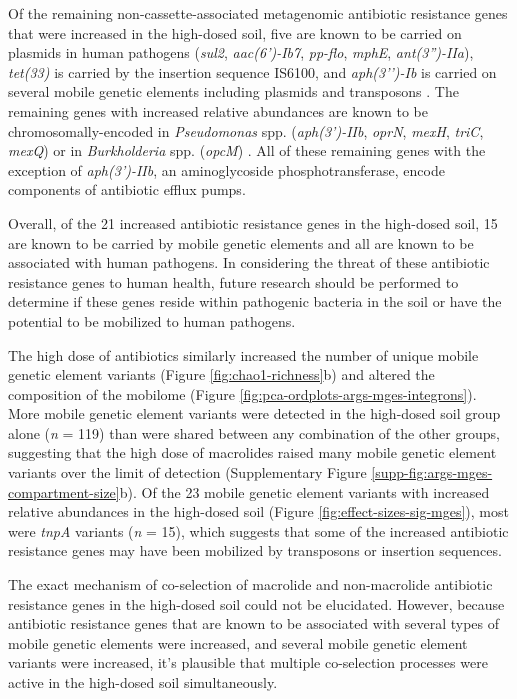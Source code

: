 Of the remaining non-cassette-associated metagenomic antibiotic resistance genes that were increased in the high-dosed soil, five are known to be carried on plasmids in human pathogens (\textit{sul2}, \textit{aac(6')-Ib7}, \textit{pp-flo}, \textit{mphE}, \textit{ant(3'')-IIa}), \textit{tet(33)} is carried by the insertion sequence IS6100, and \textit{aph(3’’)-Ib} is carried on several mobile genetic elements including plasmids and transposons \parencite{Alcock.2020, Tauch.2002}.
The remaining genes with increased relative abundances are known to be chromosomally-encoded in \textit{Pseudomonas} spp. (\textit{aph(3’)-IIb}, \textit{oprN}, \textit{mexH}, \textit{triC}, \textit{mexQ}) or in \textit{Burkholderia} spp. (\textit{opcM}) \parencite{Hachler.1996, Mesaros.2007, Mima.2005, Mima.2007, Burns.1996}.
All of these remaining genes with the exception of \textit{aph(3')-IIb}, an aminoglycoside phosphotransferase, encode components of antibiotic efflux pumps.

Overall, of the 21 increased antibiotic resistance genes in the high-dosed soil, 15 are known to be carried by mobile genetic elements and all are known to be associated with human pathogens.
In considering the threat of these antibiotic resistance genes to human health, future research should be performed to determine if these genes reside within pathogenic bacteria in the soil or have the potential to be mobilized to human pathogens.

The high dose of antibiotics similarly increased the number of unique mobile genetic element variants (Figure \ref{fig:chao1-richness}b) and altered the composition of the mobilome (Figure \ref{fig:pca-ordplots-args-mges-integrons}).
More mobile genetic element variants were detected in the high-dosed soil group alone (\textit{n} = 119) than were shared between any combination of the other groups, suggesting that the high dose of macrolides raised many mobile genetic element variants over the limit of detection (Supplementary Figure \ref{supp-fig:args-mges-compartment-size}b).
Of the 23 mobile genetic element variants with increased relative abundances in the high-dosed soil (Figure \ref{fig:effect-sizes-sig-mges}), most were \textit{tnpA} variants (\textit{n} = 15), which suggests that some of the increased antibiotic resistance genes may have been mobilized by transposons or insertion sequences.

The exact mechanism of co-selection of macrolide and non-macrolide antibiotic resistance genes in the high-dosed soil could not be elucidated.
However, because antibiotic resistance genes that are known to be associated with several types of mobile genetic elements were increased, and several mobile genetic element variants were increased, it's plausible that multiple co-selection processes were active in the high-dosed soil simultaneously.

